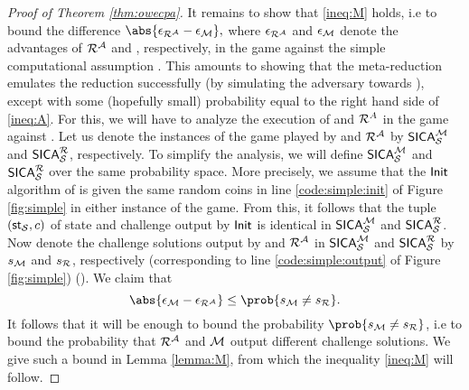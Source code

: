 \begin{proof}[Proof of Theorem \ref{thm:owecpa}]
  It remains to show that \eqref{ineq:M} holds, i.e to bound the difference
  \(
    \abs{\epsilon_{\redR^{\advA}} - \epsilon_{\redM}},
  \)
  where \(\epsilon_{\redR^{\advA}}\) and \(\epsilon_{\mathcal{M}}\) denote
  the advantages of \(\redR^{\advA}\) and \redM, respectively, in the game \SICA
  against the simple computational assumption \Simple.
  This amounts to showing that the meta-reduction \redM
  emulates the reduction \redR successfully
  (by simulating the adversary \advA towards \redR),
  except with some (hopefully small) probability equal to the right hand side of \eqref{ineq:A}.
  For this, we will have to analyze the execution of \redM and \(\redR^{A}\)
  in the game \SICA against \Simple.
  Let us denote the instances of the \SICA game played by \redM and \(\redR^{\advA}\)
  by \(\mathsf{SICA}_{\mathcal{S}}^{\mathcal{M}}\) and \(\SICA_{\Simple}^{\redR}\), respectively.
  To simplify the analysis, we will define \(\mathsf{SICA}_{\mathcal{S}}^{\mathcal{M}}\)
  and \(\SICA_{\Simple}^{\redR}\) over the same probability space.
  More precisely, we assume that the \(\mathsf{Init}\) algorithm of \Simple
  is given the same random coins in line \ref{code:simple:init} of Figure \ref{fig:simple}
  in either instance of the \SICA game.
  From this, it follows that the tuple \((\mathsf{st}_{\mathcal{S}},c)\) of state and challenge
  output by \(\mathsf{Init}\) is identical in \(\mathsf{SICA}_{\mathcal{S}}^{\mathcal{M}}\) and \(\SICA_{\Simple}^{\redR}\).
  Now denote the challenge solutions output by \redM and \(\redR^{\advA}\)
  in \(\mathsf{SICA}_{\mathcal{S}}^{\mathcal{M}}\) and \(\SICA_{\Simple}^{\redR}\)
  by \(s_{\mathcal{M}}\) and \(s_{\redR}\), respectively (corresponding to line \ref{code:simple:output} of Figure \ref{fig:simple})
  ().
  We claim that
  \begin{equation}\label{ineq:owecpa:diff}
    \abs{\epsilon_{\redM} - \epsilon_{\redR^{\advA}}} \le \prob{s_{\redM} \ne s_{\redR}}.
  \end{equation}
  It follows that it will be enough to bound the probability \(\prob{s_{\redM} \ne s_{\redR}}\),
  i.e to bound the probability that \(\redR^{\advA}\) and \(\mathcal{M}\)
  output different challenge solutions.
  We give such a bound in Lemma \ref{lemma:M}, from which the inequality \eqref{ineq:M} will follow.


\end{proof}
